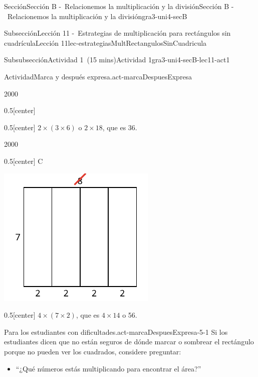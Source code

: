 \documentclass[oneside,10pt,]{article}
\begin{document}
\begin{sectionptx}{Sección}{Sección B -~Relacionemos la multiplicación y la división}{}{Sección B -~Relacionemos la multiplicación y la división}{}{}{gra3-uni4-secB}
\begin{subsectionptx}{Subsección}{Lección 11 -~Estrategias de multiplicación para rectángulos sin cuadrícula}{}{Lección 11}{}{}{lec-estrategiasMultRectangulosSinCuadricula}
\begin{subsubsectionptx}{Subsubsección}{Actividad 1~(15 mins)}{}{Actividad 1}{}{}{gra3-uni4-secB-lec11-act1}
\begin{activity}{Actividad}{Marca y después expresa.}{act-marcaDespuesExpresa}
\begin{sidebyside}{2}{0}{0}{0}
\begin{sbspanel}{0.5}[center]
\end{sbspanel}%
\begin{sbspanel}{0.5}[center]%
\(2 \times (3 \times 6)\) o \(2 \times 18\), que es 36.%
\end{sbspanel}%
\end{sidebyside}%
\begin{sidebyside}{2}{0}{0}{0}%
\begin{sbspanel}{0.5}[center]%
C%
\par
\includegraphics[width=\linewidth]{external/svg-source/tikz-file-153089.pdf}
\end{sbspanel}%
\begin{sbspanel}{0.5}[center]%
\(4 \times (7 \times 2) \), que es \(4 \times 14\) o 56.%
\end{sbspanel}%
\end{sidebyside}%
\end{activity}%
%
\par
\begin{paragraphs}{Para los estudiantes con dificultades.}{act-marcaDespuesExpresa-5-1}%
Si los estudiantes dicen que no están seguros de dónde marcar o sombrear el rectángulo porque no pueden ver los cuadrados, considere preguntar:%
%
\begin{itemize}[label=\textbullet]
\item{}``¿Qué números estás multiplicando para encontrar el área?''%

\end{itemize}
\end{paragraphs}
\end{subsubsectionptx}
\end{subsectionptx}
\end{sectionptx}
\end{document}
